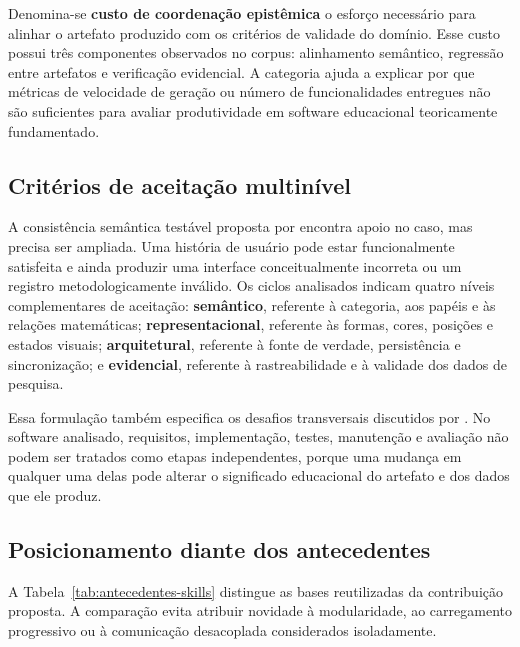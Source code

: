 \documentclass[preprint,12pt,authoryear]{elsarticle}
\begin{document}
Denomina-se \textbf{custo de coordenação epistêmica} o esforço necessário para alinhar o artefato produzido com os critérios de validade do domínio. Esse custo possui três componentes observados no corpus: alinhamento semântico, regressão entre artefatos e verificação evidencial. A categoria ajuda a explicar por que métricas de velocidade de geração ou número de funcionalidades entregues não são suficientes para avaliar produtividade em software educacional teoricamente fundamentado.

\subsection{Critérios de aceitação multinível}
A consistência semântica testável proposta por \citet{zhang2024agilegen} encontra apoio no caso, mas precisa ser ampliada. Uma história de usuário pode estar funcionalmente satisfeita e ainda produzir uma interface conceitualmente incorreta ou um registro metodologicamente inválido. Os ciclos analisados indicam quatro níveis complementares de aceitação: \textbf{semântico}, referente à categoria, aos papéis e às relações matemáticas; \textbf{representacional}, referente às formas, cores, posições e estados visuais; \textbf{arquitetural}, referente à fonte de verdade, persistência e sincronização; e \textbf{evidencial}, referente à rastreabilidade e à validade dos dados de pesquisa.

Essa formulação também especifica os desafios transversais discutidos por \citet{gao2024challenges}. No software analisado, requisitos, implementação, testes, manutenção e avaliação não podem ser tratados como etapas independentes, porque uma mudança em qualquer uma delas pode alterar o significado educacional do artefato e dos dados que ele produz.

\subsection{Posicionamento diante dos antecedentes}

A Tabela~\ref{tab:antecedentes-skills} distingue as bases reutilizadas da contribuição proposta. A comparação evita atribuir novidade à modularidade, ao carregamento progressivo ou à comunicação desacoplada considerados isoladamente.
\end{document}
